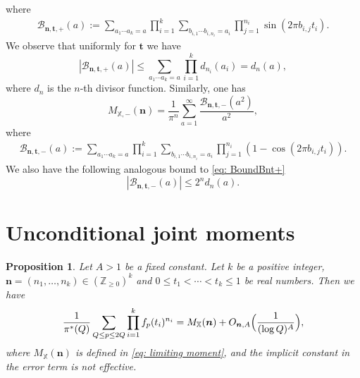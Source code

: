 \documentclass[10pt]{amsart}
\theoremstyle{plain}
\newtheorem{pro}[thm]{Proposition}
\theoremstyle{definition}
\newcommand{\X}{\mathbb{X}}
\begin{document}
where
\begin{align*}
\mathcal{B}_{\boldsymbol{n},\mathbf{t},+}(a)
:= \sum_{a_{1}\cdots a_{k} = a} \prod_{i = 1}^k \sum_{b_{i,1} \cdots b_{i,n_i} = a_i } \prod_{j = 1}^{n_i} \sin(2 \pi b_{i,j} t_i).
\end{align*}
We observe that uniformly for $\mathbf{t}$ we have
\begin{equation}\label{eq: BoundBnt+}
|\mathcal{B}_{\boldsymbol{n},\mathbf{t}, +}(a)| \leq \sum_{a_1 \cdots a_k = a} \prod_{i = 1}^k d_{n_i}(a_i) = d_n (a),
\end{equation}
where $d_n$ is the $n$-th divisor function.
Similarly, one has
\begin{equation}\label{eq: FormulaMomentRandom-}
M_{\X,-}(\boldsymbol{n})= \frac{1}{\pi^{n}} \sum_{a=1}^{\infty} \frac{\mathcal{B}_{\boldsymbol{n},\mathbf{t}, -}(a^2)}{a^2},
\end{equation}
where \begin{align*}
\mathcal{B}_{\boldsymbol{n},\mathbf{t},-}(a)
:= \sum_{a_{1}\cdots a_{k} = a} \prod_{i = 1}^k \sum_{b_{i,1}\cdots b_{i,n_i} = a_i } \prod_{j = 1}^{n_i} (1-\cos(2 \pi b_{i,j} t_i)).
\end{align*}
We also have the following analogous bound to \eqref{eq: BoundBnt+}
\begin{equation}\label{eq: BoundBnt-}|\mathcal{B}_{\boldsymbol{n},\mathbf{t}, -}(a)|\leq 2^nd_n(a).
\end{equation}
\section{Unconditional joint moments}\label{s: proof of convergence in finite distributions real}
\setcounter{thm}{1}
\begin{pro}\label{thm: moments theorem}
Let $A>1$ be a fixed constant. Let $k$ be a positive integer, $\boldsymbol{n} = (n_1, \dots, n_k)\in (\mathbb{Z}_{\geq 0})^k$ and $0 \leq t_1 < \cdots < t_k \leq 1$ be real numbers. Then we have
\begin{equation}\label{AsymptoticMomentsMQ}
\frac{1}{\pi^*(Q)} \sum_{Q\leq p \leq 2Q} \prod_{i =1}^k f_{p}(t_i)^{n_i}= M_{\X}(\boldsymbol{n}) + O_{\boldsymbol{n}, A}\Bigl(\frac{1}{(\log Q)^{A}}\Bigr),
\end{equation}
where $M_{\X}(\boldsymbol{n})$ is defined in \eqref{eq: limiting moment}, and the implicit constant in the error term is not effective.
\end{pro}
\end{document}
